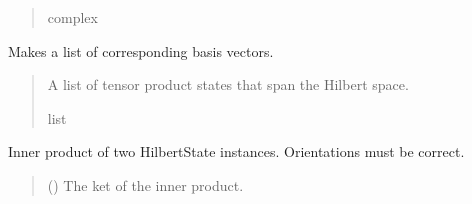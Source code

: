 \documentclass[letterpaper,10pt,english]{sphinxmanual}
\begin{document}
\begin{fulllineitems}
\begin{fulllineitems}
\begin{quote}
\begin{description}
\sphinxAtStartPar
complex

\end{description}\end{quote}

\end{fulllineitems}


\begin{fulllineitems}
\label{\detokenize{spinbox:spinbox.core.HilbertState.generate_basis_states}}
\pysigstartsignatures
{}
\pysigstopsignatures
\sphinxAtStartPar
Makes a list of corresponding basis vectors.
\begin{quote}\begin{description}
\sphinxAtStartPar
A list of tensor product states that span the Hilbert space.

\sphinxAtStartPar
list

\end{description}\end{quote}

\end{fulllineitems}


\begin{fulllineitems}
\label{\detokenize{spinbox:spinbox.core.HilbertState.inner}}
\pysigstartsignatures
{}
\pysigstopsignatures
\sphinxAtStartPar
Inner product of two HilbertState instances. Orientations must be correct.
\begin{quote}\begin{description}
\sphinxAtStartPar
{} ({\hyperref[\detokenize{spinbox:spinbox.core.HilbertState}]{}}) \textendash{} The ket of the inner product.


\end{description}
\end{quote}
\end{fulllineitems}
\end{fulllineitems}
\end{document}
